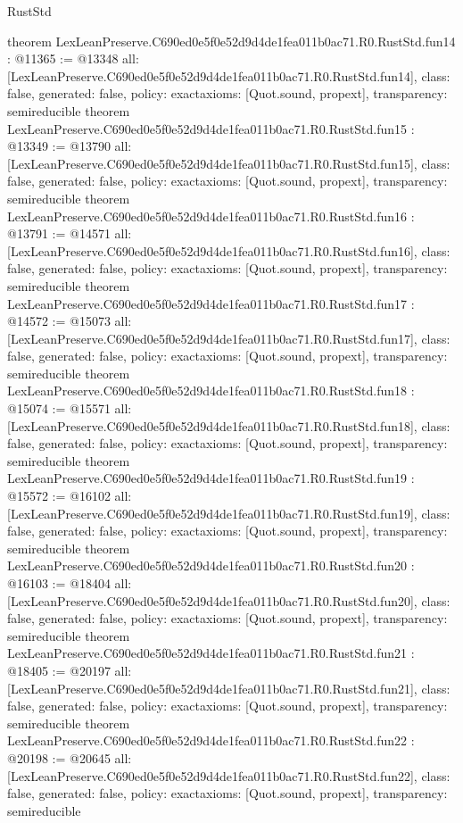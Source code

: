 \begin{lexlean}{RustStd}
\begin{coremodule}
{}
theorem LexLeanPreserve.C690ed0e5f0e52d9d4de1fea011b0ac71.R0.RustStd.fun14 : @11365 := @13348 {
  all: [LexLeanPreserve.C690ed0e5f0e52d9d4de1fea011b0ac71.R0.RustStd.fun14],
  class: false,
  generated: false,
  policy: exact{axioms: [Quot.sound, propext]},
  transparency: semireducible
}
theorem LexLeanPreserve.C690ed0e5f0e52d9d4de1fea011b0ac71.R0.RustStd.fun15 : @13349 := @13790 {
  all: [LexLeanPreserve.C690ed0e5f0e52d9d4de1fea011b0ac71.R0.RustStd.fun15],
  class: false,
  generated: false,
  policy: exact{axioms: [Quot.sound, propext]},
  transparency: semireducible
}
theorem LexLeanPreserve.C690ed0e5f0e52d9d4de1fea011b0ac71.R0.RustStd.fun16 : @13791 := @14571 {
  all: [LexLeanPreserve.C690ed0e5f0e52d9d4de1fea011b0ac71.R0.RustStd.fun16],
  class: false,
  generated: false,
  policy: exact{axioms: [Quot.sound, propext]},
  transparency: semireducible
}
theorem LexLeanPreserve.C690ed0e5f0e52d9d4de1fea011b0ac71.R0.RustStd.fun17 : @14572 := @15073 {
  all: [LexLeanPreserve.C690ed0e5f0e52d9d4de1fea011b0ac71.R0.RustStd.fun17],
  class: false,
  generated: false,
  policy: exact{axioms: [Quot.sound, propext]},
  transparency: semireducible
}
theorem LexLeanPreserve.C690ed0e5f0e52d9d4de1fea011b0ac71.R0.RustStd.fun18 : @15074 := @15571 {
  all: [LexLeanPreserve.C690ed0e5f0e52d9d4de1fea011b0ac71.R0.RustStd.fun18],
  class: false,
  generated: false,
  policy: exact{axioms: [Quot.sound, propext]},
  transparency: semireducible
}
theorem LexLeanPreserve.C690ed0e5f0e52d9d4de1fea011b0ac71.R0.RustStd.fun19 : @15572 := @16102 {
  all: [LexLeanPreserve.C690ed0e5f0e52d9d4de1fea011b0ac71.R0.RustStd.fun19],
  class: false,
  generated: false,
  policy: exact{axioms: [Quot.sound, propext]},
  transparency: semireducible
}
theorem LexLeanPreserve.C690ed0e5f0e52d9d4de1fea011b0ac71.R0.RustStd.fun20 : @16103 := @18404 {
  all: [LexLeanPreserve.C690ed0e5f0e52d9d4de1fea011b0ac71.R0.RustStd.fun20],
  class: false,
  generated: false,
  policy: exact{axioms: [Quot.sound, propext]},
  transparency: semireducible
}
theorem LexLeanPreserve.C690ed0e5f0e52d9d4de1fea011b0ac71.R0.RustStd.fun21 : @18405 := @20197 {
  all: [LexLeanPreserve.C690ed0e5f0e52d9d4de1fea011b0ac71.R0.RustStd.fun21],
  class: false,
  generated: false,
  policy: exact{axioms: [Quot.sound, propext]},
  transparency: semireducible
}
theorem LexLeanPreserve.C690ed0e5f0e52d9d4de1fea011b0ac71.R0.RustStd.fun22 : @20198 := @20645 {
  all: [LexLeanPreserve.C690ed0e5f0e52d9d4de1fea011b0ac71.R0.RustStd.fun22],
  class: false,
  generated: false,
  policy: exact{axioms: [Quot.sound, propext]},
  transparency: semireducible
}
\end{coremodule}
\end{lexlean}
